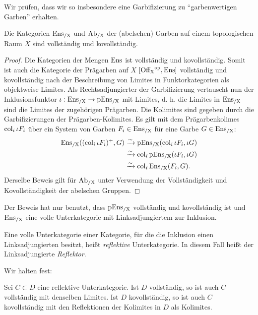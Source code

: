Wir prüfen, dass wir so insbesondere eine Garbifizierung zu
``garbenwertigen Garben'' erhalten.
\begin{lemma} \label{ensx-complete}
  Die Kategorien $\operatorname{Ens_{/X}}$ und $\operatorname{Ab_{/X}}$ der (abelschen) Garben auf einem
  topologischen Raum $X$ sind vollständig und kovollständig.
\end{lemma}
\begin{proof}
  Die Kategorien der Mengen $\operatorname{Ens}$ ist vollständig und
  kovollständig. Somit ist auch die Kategorie der Prägarben auf $X$
  $[\operatorname{Off_X}^\mathrm{op}, \operatorname{Ens}]$ vollständig und kovollständig nach der
  Beschreibung von Limites in Funktorkategorien als objektweise
  Limites. Als Rechtsadjungierter der Garbifizierung vertauscht nun
  der Inklusionsfunktor $\iota: \operatorname{Ens_{/X}} \to \operatorname{pEns_{/X}}$ mit Limites,
  d. h. die Limites in $\operatorname{Ens_{/X}}$ sind die Limites der zugehörigen
  Prägarben. Die Kolimites sind gegeben durch die Garbifizierungen der
  Prägarben-Kolimites. Es gilt mit dem Prägarbenkolimes $\operatorname{col}_i \iota
  F_i$ über ein System von Garben $F_i \in \operatorname{Ens_{/X}}$ für eine Garbe $G
  \in \operatorname{Ens_{/X}}$:
  \begin{align*}
    \operatorname{Ens_{/X}}((\operatorname{col}_i \iota F_i)^+, G)
    &\xrightarrow[]{\sim} \operatorname{pEns_{/X}}(\operatorname{col}_i \iota F_i, \iota G) \\
    &\xrightarrow[]{\sim} \operatorname{col}_i \operatorname{pEns_{/X}}(\iota F_i, \iota G) \\
    &\xrightarrow[]{\sim} \operatorname{col}_i \operatorname{Ens_{/X}}(F_i, G).
  \end{align*}
  Derselbe Beweis gilt für $\operatorname{Ab_{/X}}$ unter Verwendung der Vollständigkeit
  und Kovollständigkeit der abelschen Gruppen.
\end{proof}
Der Beweis hat nur benutzt, dass $\operatorname{pEns_{/X}}$ vollständig und
kovollständig ist und $\operatorname{Ens_{/X}}$ eine volle Unterkategorie mit
Linksadjungiertem zur Inklusion.
\begin{defn} \label{refl-sub}
  Eine volle Unterkategorie einer Kategorie, für die die Inklusion
  einen Linksadjungierten besitzt, heißt \emph{reflektive}
  Unterkategorie. In diesem Fall heißt der Linksadjungierte
  \emph{Reflektor}.
\end{defn}
Wir halten fest:
\begin{prop} \label{refl-sub-complete}
  Sei $C \subset D$ eine reflektive Unterkategorie. Ist $D$
  vollständig, so ist auch $C$ vollständig mit denselben Limites. Ist
  $D$ kovollständig, so ist auch $C$ kovollständig mit den
  Reflektionen der Kolimites in $D$ als Kolimites.
\end{prop}

